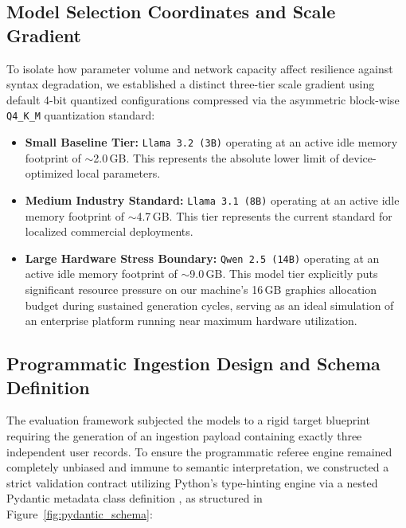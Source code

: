 \documentclass[11pt,journal,compsoc,onecolumn]{IEEEtran}
\begin{document}
\subsection{Model Selection Coordinates and Scale Gradient}
To isolate how parameter volume and network capacity affect resilience against syntax degradation, we established a distinct three-tier scale gradient using default 4-bit quantized configurations compressed via the asymmetric block-wise \texttt{Q4\_K\_M} quantization standard:
\begin{itemize}
    \item \textbf{Small Baseline Tier:} \texttt{Llama 3.2 (3B)} operating at an active idle memory footprint of $\sim$2.0\,GB. This represents the absolute lower limit of device-optimized local parameters.
    \item \textbf{Medium Industry Standard:} \texttt{Llama 3.1 (8B)} operating at an active idle memory footprint of $\sim$4.7\,GB. This tier represents the current standard for localized commercial deployments.
    \item \textbf{Large Hardware Stress Boundary:} \texttt{Qwen 2.5 (14B)} operating at an active idle memory footprint of $\sim$9.0\,GB. This model tier explicitly puts significant resource pressure on our machine's 16\,GB graphics allocation budget during sustained generation cycles, serving as an ideal simulation of an enterprise platform running near maximum hardware utilization.
\end{itemize}

\subsection{Programmatic Ingestion Design and Schema Definition}
The evaluation framework subjected the models to a rigid target blueprint requiring the generation of an ingestion payload containing exactly three independent user records. To ensure the programmatic referee engine remained completely unbiased and immune to semantic interpretation, we constructed a strict validation contract utilizing Python's type-hinting engine via a nested Pydantic metadata class definition \cite{pydantic2025}, as structured in Figure~\ref{fig:pydantic_schema}:
\end{document}
